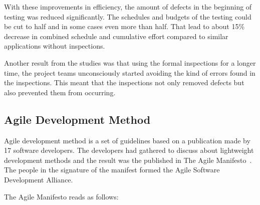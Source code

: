 With these improvements in efficiency, the amount of defects in the beginning of testing was reduced significantly. The schedules and budgets of the testing could be cut to half and in some cases even more than half. That lead to about 15\% decrease in combined schedule and cumulative effort compared to similar applications without inspections.

Another result from the studies was that using the formal inspections for a longer time, the project teams unconsciously started avoiding the kind of errors found in the inspections. This meant that the inspections not only removed defects but also prevented them from occurring.


\subsection{Agile Development Method} 
Agile development method is a set of guidelines based on a publication made by 17 software developers. The developers had gathered to discuss about lightweight development methods and the result was the published in The Agile Manifesto~\cite{beck2001agile}. The people in the signature of the manifest formed the Agile Software Development Alliance.

The Agile Manifesto reads as follows:

